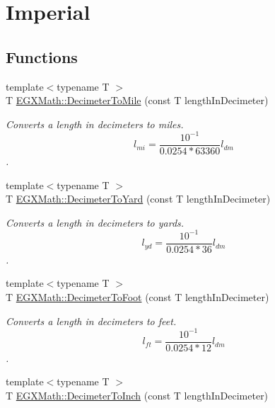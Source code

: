 \hypertarget{group___e_g_x_math-_conversions-_length_conversions-_s_i-_decimeter-_imperial}{}\section{Imperial}
\label{group___e_g_x_math-_conversions-_length_conversions-_s_i-_decimeter-_imperial}
\subsection*{Functions}
\begin{DoxyCompactItemize}
\item 
{\footnotesize template$<$typename T $>$ }\\T \mbox{\hyperlink{group___e_g_x_math-_conversions-_length_conversions-_s_i-_decimeter-_imperial_gab7d9d207fb6aa53999300baf5d9cea16}{E\+G\+X\+Math\+::\+Decimeter\+To\+Mile}} (const T length\+In\+Decimeter)
\begin{DoxyCompactList}\small\item\em Converts a length in decimeters to miles. \[ l_{mi}=\frac{10^{-1}}{0.0254 * 63360} l_{dm} \]. \end{DoxyCompactList}\item 
{\footnotesize template$<$typename T $>$ }\\T \mbox{\hyperlink{group___e_g_x_math-_conversions-_length_conversions-_s_i-_decimeter-_imperial_ga2ffbd73da0cc3cbb36822127433e3267}{E\+G\+X\+Math\+::\+Decimeter\+To\+Yard}} (const T length\+In\+Decimeter)
\begin{DoxyCompactList}\small\item\em Converts a length in decimeters to yards. \[ l_{yd}= \frac{10^{-1}}{0.0254 * 36} l_{dm} \]. \end{DoxyCompactList}\item 
{\footnotesize template$<$typename T $>$ }\\T \mbox{\hyperlink{group___e_g_x_math-_conversions-_length_conversions-_s_i-_decimeter-_imperial_gaf86c80f8ce1e5ab6113a2a912c1f446e}{E\+G\+X\+Math\+::\+Decimeter\+To\+Foot}} (const T length\+In\+Decimeter)
\begin{DoxyCompactList}\small\item\em Converts a length in decimeters to feet. \[ l_{ft}= \frac{10^{-1}}{0.0254 * 12} l_{dm} \]. \end{DoxyCompactList}\item 
{\footnotesize template$<$typename T $>$ }\\T \mbox{\hyperlink{group___e_g_x_math-_conversions-_length_conversions-_s_i-_decimeter-_imperial_ga51bb6347b1c3ca746b7a3eadc3852e37}{E\+G\+X\+Math\+::\+Decimeter\+To\+Inch}} (const T length\+In\+Decimeter)

\end{DoxyCompactItemize}
